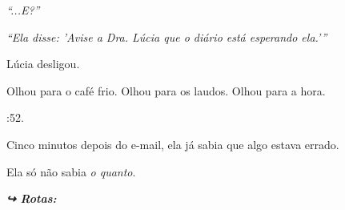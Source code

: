 \noindent \textit{\textquotedblleft{}...E?\textquotedblright{}}

\noindent \textit{\textquotedblleft{}Ela disse: 'Avise a Dra. Lúcia que o diário está esperando ela.'\textquotedblright{}}

\noindent Lúcia desligou.

\noindent Olhou para o café frio.
Olhou para os laudos.
Olhou para a hora.

:52.

\noindent Cinco minutos depois do e-mail, ela já sabia que algo estava errado.

\noindent Ela só não sabia \textit{o quanto}.

\vspace{0.5em}
\noindent\textit{\textbf{↪ Rotas:}  \rotasep {}}
